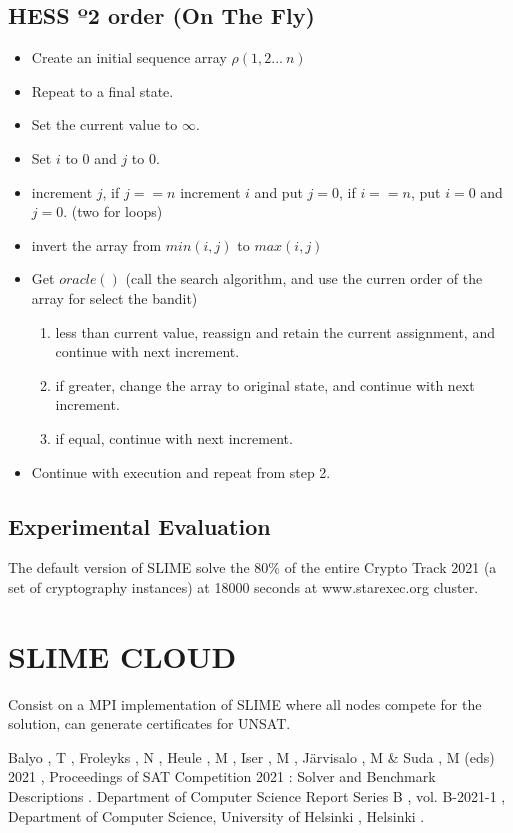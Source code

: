 \documentclass[conference]{IEEEtran}
\begin{document}
\subsection{HESS º2 order (On The Fly)}
\begin{itemize}
\item Create an initial sequence array $\rho(1, 2 \dots\ n)$
\item Repeat to a final state.
\item Set the current value to $\infty$.
\item Set $i$ to 0 and $j$ to 0.
\item increment $j$, if $j == n$ increment $i$ and put $j = 0$, if $i == n$, put $i = 0$ and $j = 0$. (two for loops)
\item invert the array from $min(i, j)$ to $max(i, j)$
\item Get $oracle()$ (call the search algorithm, and use the curren order of the array for select the bandit)
    \begin{enumerate}
        \item less than current value, reassign and retain the current assignment, and continue with next increment.
        \item if greater, change the array to original state, and continue with next increment.
        \item if equal, continue with next increment.
    \end{enumerate}
\item Continue with execution and repeat from step 2.
\end{itemize}

\subsection{Experimental Evaluation}

The default version of SLIME solve the 80\% of the entire Crypto Track 2021 (a set of cryptography instances) at 18000 seconds at www.starexec.org cluster.

\section{SLIME CLOUD}

Consist on a MPI implementation of SLIME where all nodes compete for the solution, can generate certificates for UNSAT.

\begin{thebibliography}{00}
 Balyo , T , Froleyks , N , Heule , M , Iser , M , Järvisalo , M & Suda , M (eds) 2021 , Proceedings of SAT Competition 2021 : Solver and Benchmark Descriptions . Department of Computer Science Report Series B , vol. B-2021-1 , Department of Computer Science, University of Helsinki , Helsinki .
\end{thebibliography}
\vspace{12pt}
\end{document}
